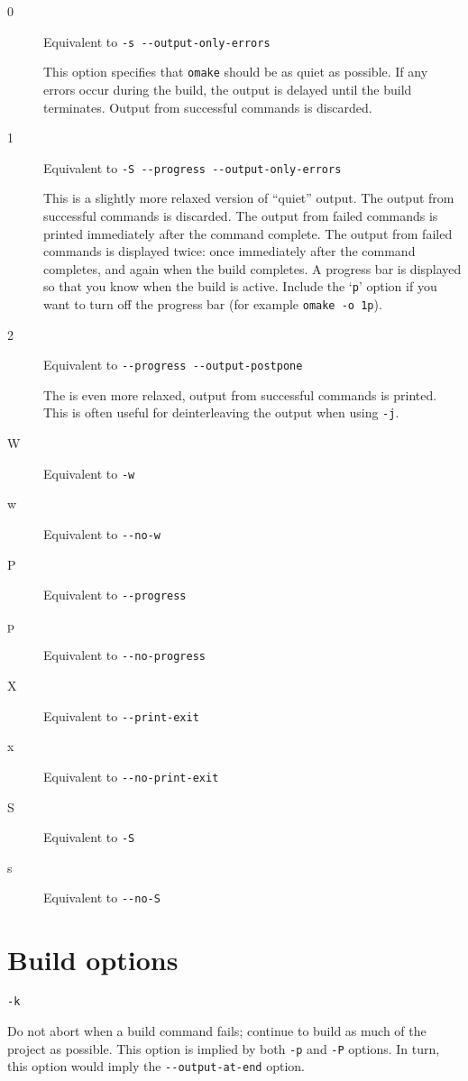 \begin{description}
\item[0] Equivalent to \verb+-s --output-only-errors+

This option specifies that \verb+omake+ should be as quiet as possible.  If any errors occur
during the build, the output is delayed until the build terminates.  Output from successful commands
is discarded.

\item[1] Equivalent to \verb+-S --progress --output-only-errors+

This is a slightly more relaxed version of ``quiet'' output.  The output from successful commands is
discarded.  The output from failed commands is printed immediately after the command complete.  The
output from failed commands is displayed twice: once immediately after the command completes, and
again when the build completes.  A progress bar is displayed so that you know when the build is
active.  Include the `\verb+p+' option if you want to turn off the progress bar (for example
\verb+omake -o 1p+).

\item[2] Equivalent to \verb+--progress --output-postpone+

The is even more relaxed, output from successful commands is printed.
This is often useful for deinterleaving the output when using \verb+-j+.

\item[W] Equivalent to \verb+-w+
\item[w] Equivalent to \verb+--no-w+
\item[P] Equivalent to \verb+--progress+
\item[p] Equivalent to \verb+--no-progress+
\item[X] Equivalent to \verb+--print-exit+
\item[x] Equivalent to \verb+--no-print-exit+
\item[S] Equivalent to \verb+-S+
\item[s] Equivalent to \verb+--no-S+
\end{description}

\section{Build options}

 \verb+-k+

Do not abort when a build command fails; continue to build as much of the project as possible. This
option is implied by both \verb+-p+ and \verb+-P+ options. In turn, this option would imply the
\verb+--output-at-end+ option.

